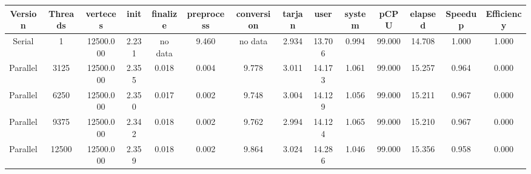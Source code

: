 \begin{tabular}{|c|c|c|c|c|c|c|c|c|c|c|c|c|c|}
\toprule
 Version &  Threads &  verteces &  init & finalize &  preprocess & conversion &  tarjan &   user &  system &   pCPU &  elapsed &  Speedup &  Efficiency \\
\midrule
  Serial &        1 & 12500.000 & 2.231 &  no data &       9.460 &    no data &   2.934 & 13.706 &   0.994 & 99.000 &   14.708 &    1.000 &       1.000 \\
Parallel &     3125 & 12500.000 & 2.355 &    0.018 &       0.004 &      9.778 &   3.011 & 14.173 &   1.061 & 99.000 &   15.257 &    0.964 &       0.000 \\
Parallel &     6250 & 12500.000 & 2.350 &    0.017 &       0.002 &      9.748 &   3.004 & 14.129 &   1.056 & 99.000 &   15.211 &    0.967 &       0.000 \\
Parallel &     9375 & 12500.000 & 2.342 &    0.018 &       0.002 &      9.762 &   2.994 & 14.124 &   1.065 & 99.000 &   15.210 &    0.967 &       0.000 \\
Parallel &    12500 & 12500.000 & 2.359 &    0.018 &       0.002 &      9.864 &   3.024 & 14.286 &   1.046 & 99.000 &   15.356 &    0.958 &       0.000 \\
\bottomrule
\end{tabular}
